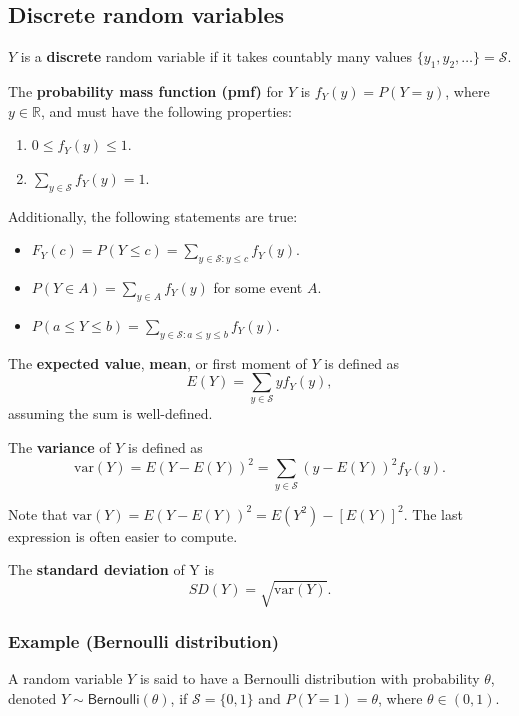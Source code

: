 \documentclass[
]{book}
\providecommand{\tightlist}{%
  \setlength{\itemsep}{0pt}\setlength{\parskip}{0pt}}
\theoremstyle{definition}
\theoremstyle{definition}
\theoremstyle{definition}
\theoremstyle{definition}
\theoremstyle{remark}
\begin{document}
\hypertarget{discrete-random-variables}{%
\subsection{Discrete random variables}\label{discrete-random-variables}}

\(Y\) is a \textbf{discrete} random variable if it takes countably many values \(\{y_1, y_2, \dots \} = \mathcal{S}\).

The \textbf{probability mass function (pmf)} for \(Y\) is \(f_Y (y)=P(Y=y)\), where \(y\in \mathbb{R}\), and must have the following properties:

\begin{enumerate}
\def\labelenumi{\arabic{enumi}.}
\tightlist
\item
  \(0 \leq f_Y(y) \leq 1\).
\item
  \(\sum_{y\in \mathcal{S}} f_Y(y) = 1\).
\end{enumerate}

Additionally, the following statements are true:

\begin{itemize}
\tightlist
\item
  \(F_Y(c) = P(Y \leq c) = \sum_{y\in \mathcal{S}:y \leq c} f_Y(y)\).
\item
  \(P(Y \in A) = \sum_{y \in A} f_Y(y)\) for some event \(A\).
\item
  \(P(a \leq Y \leq b) = \sum_{y\in\mathcal{S}:a\leq y\leq b} f_Y(y)\).
\end{itemize}

The \textbf{expected value}, \textbf{mean}, or first moment of \(Y\) is defined as
\[ E(Y) = \sum_{y\in \mathcal{S}} y f_Y(y), \]
assuming the sum is well-defined.

The \textbf{variance} of \(Y\) is defined as
\[
\mathrm{var}(Y)=E(Y-E(Y))^2 = 
\sum_{y\in \mathcal{S}} (y - E(Y))^2 f_Y(y).
\]

Note that \(\mathrm{var}(Y)=E(Y-E(Y))^2=E(Y^2)-[E(Y)]^2\). The last expression is often easier to compute.

The \textbf{standard deviation} of Y is
\[SD(Y)=\sqrt{\mathrm{var}(Y)  }.\]

\hypertarget{example-bernoulli-distribution}{%
\subsubsection{Example (Bernoulli distribution)}\label{example-bernoulli-distribution}}

A random variable \(Y\) is said to have a Bernoulli distribution with probability \(\theta\), denoted \(Y\sim \mathsf{Bernoulli}(\theta)\), if \(\mathcal{S} = \{0, 1\}\) and \(P(Y = 1) = \theta\), where \(\theta\in (0,1)\).
\end{document}
